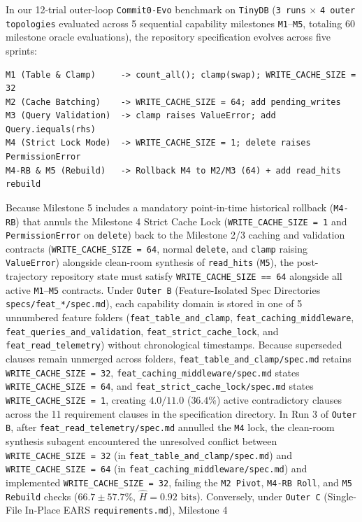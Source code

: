 \documentclass[11pt,a4paper,copyright]{google}
\begin{document}
In our 12-trial outer-loop \texttt{Commit0-Evo} benchmark on \texttt{TinyDB} (\texttt{3 runs} $\times$ \texttt{4 outer topologies} evaluated across 5 sequential capability milestones \texttt{M1}--\texttt{M5}, totaling 60 milestone oracle evaluations), the repository specification evolves across five sprints:
\begin{verbatim}
M1 (Table & Clamp)     -> count_all(); clamp(swap); WRITE_CACHE_SIZE = 32
M2 (Cache Batching)    -> WRITE_CACHE_SIZE = 64; add pending_writes
M3 (Query Validation)  -> clamp raises ValueError; add Query.iequals(rhs)
M4 (Strict Lock Mode)  -> WRITE_CACHE_SIZE = 1; delete raises PermissionError
M4-RB & M5 (Rebuild)   -> Rollback M4 to M2/M3 (64) + add read_hits rebuild
\end{verbatim}
Because Milestone 5 includes a mandatory point-in-time historical rollback (\texttt{M4-RB}) that annuls the Milestone 4 Strict Cache Lock (\texttt{WRITE\_CACHE\_SIZE = 1} and \texttt{PermissionError} on \texttt{delete}) back to the Milestone 2/3 caching and validation contracts (\texttt{WRITE\_CACHE\_SIZE = 64}, normal \texttt{delete}, and \texttt{clamp} raising \texttt{ValueError}) alongside clean-room synthesis of \texttt{read\_hits} (\texttt{M5}), the post-trajectory repository state must satisfy \texttt{WRITE\_CACHE\_SIZE == 64} alongside all active \texttt{M1}--\texttt{M5} contracts. Under \texttt{Outer B} (Feature-Isolated Spec Directories \texttt{specs/\allowbreak feat\_*/\allowbreak spec.md}), each capability domain is stored in one of 5 unnumbered feature folders (\texttt{feat\_\allowbreak table\_\allowbreak and\_\allowbreak clamp}, \texttt{feat\_\allowbreak caching\_\allowbreak middleware}, \texttt{feat\_\allowbreak queries\_\allowbreak and\_\allowbreak validation}, \texttt{feat\_\allowbreak strict\_\allowbreak cache\_\allowbreak lock}, and \texttt{feat\_\allowbreak read\_\allowbreak telemetry}) without chronological timestamps. Because superseded clauses remain unmerged across folders, \texttt{feat\_\allowbreak table\_\allowbreak and\_\allowbreak clamp/\allowbreak spec.md} retains \texttt{WRITE\_CACHE\_SIZE = 32}, \texttt{feat\_\allowbreak caching\_\allowbreak middleware/\allowbreak spec.md} states \texttt{WRITE\_CACHE\_SIZE = 64}, and \texttt{feat\_\allowbreak strict\_\allowbreak cache\_\allowbreak lock/\allowbreak spec.md} states \texttt{WRITE\_CACHE\_SIZE = 1}, creating $4.0/11.0$ ($36.4\%$) active contradictory clauses across the 11 requirement clauses in the specification directory. In Run 3 of \texttt{Outer B}, after \texttt{feat\_\allowbreak read\_\allowbreak telemetry/\allowbreak spec.md} annulled the \texttt{M4} lock, the clean-room synthesis subagent encountered the unresolved conflict between \texttt{WRITE\_CACHE\_SIZE = 32} (in \texttt{feat\_\allowbreak table\_\allowbreak and\_\allowbreak clamp/\allowbreak spec.md}) and \texttt{WRITE\_CACHE\_SIZE = 64} (in \texttt{feat\_\allowbreak caching\_\allowbreak middleware/\allowbreak spec.md}) and implemented \texttt{WRITE\_CACHE\_SIZE = 32}, failing the \texttt{M2 Pivot}, \texttt{M4-RB Roll}, and \texttt{M5 Rebuild} checks ($66.7 \pm 57.7\%$, $\hat{H} = 0.92\text{ bits}$). Conversely, under \texttt{Outer C} (Single-File In-Place EARS \texttt{requirements.md}), Milestone 4 
\end{document}
